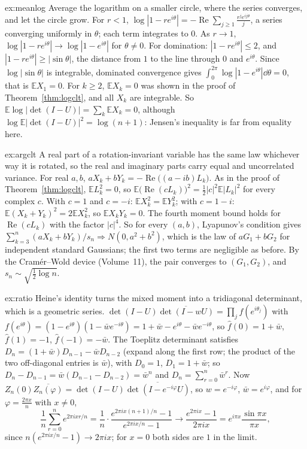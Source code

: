 \begin{solution}{ex:meanlog}
\idea Average the logarithm on a smaller circle, where the series converges, and let the circle grow.
\writeup For $r<1$, $\log|1-re^{i\theta}|=-\operatorname{Re}\sum_{j\ge1}\frac{r^je^{ij\theta}}j$, a series converging uniformly in $\theta$; each term integrates to $0$. As $r\to1$, $\log|1-re^{i\theta}|\to\log|1-e^{i\theta}|$ for $\theta\ne0$. For domination: $|1-re^{i\theta}|\le2$, and $|1-re^{i\theta}|\ge|\sin\theta|$, the distance from $1$ to the line through $0$ and $e^{i\theta}$. Since $\log|\sin\theta|$ is
integrable, dominated convergence gives $\int_0^{2\pi}\log|1-e^{i\theta}|\dd\theta=0$, that is $\mathbb EX_1=0$. For $k\ge2$, $\mathbb EX_k=0$ was shown in the proof of Theorem~\ref{thm:logclt}, and all $X_k$ are integrable. So
$\mathbb E\log|\det(I-U)|=\sum_k\mathbb EX_k=0$, although $\log\mathbb E|\det(I-U)|^2=\log(n+1)$: Jensen's inequality is far from equality here.
\end{solution}

\begin{solution}{ex:argclt}
\idea A real part of a rotation-invariant variable has the same law whichever way it is rotated, so the real and imaginary parts carry equal and uncorrelated variance.
\writeup For real $a,b$, $aX_k+bY_k=-\operatorname{Re}\bigl((a-ib)L_k\bigr)$. As in the proof of Theorem~\ref{thm:logclt}, $\mathbb EL_k^2=0$, so $\mathbb E\bigl(\operatorname{Re}(cL_k)\bigr)^2=\frac12|c|^2\mathbb E|L_k|^2$ for every complex $c$. With $c=1$ and $c=-i$:
$\mathbb EX_k^2=\mathbb EY_k^2$; with $c=1-i$: $\mathbb E(X_k+Y_k)^2=2\mathbb EX_k^2$, so $\mathbb EX_kY_k=0$. The fourth moment bound holds for $\operatorname{Re}(cL_k)$ with the factor $|c|^4$. So for every $(a,b)$, Lyapunov's condition gives
$\sum_{k=3}^n(aX_k+bY_k)/s_n\Rightarrow N(0,a^2+b^2)$, which is the law of $aG_1+bG_2$ for independent standard Gaussians; the first two terms are negligible as before. By the Cram\'er--Wold device (Volume~11), the pair converges to $(G_1,G_2)$, and
$s_n\sim\sqrt{\frac12\log n}$.
\end{solution}

\begin{solution}{ex:ratio}
\idea Heine's identity turns the mixed moment into a tridiagonal determinant, which is a geometric series.
\writeup $\det(I-U)\overline{\det(I-wU)}=\prod_jf(e^{i\theta_j})$ with $f(e^{i\theta})=(1-e^{i\theta})(1-\bar we^{-i\theta})=1+\bar w-e^{i\theta}-\bar we^{-i\theta}$, so $\hat f(0)=1+\bar w$, $\hat f(1)=-1$, $\hat f(-1)=-\bar w$. The Toeplitz determinant satisfies
$D_n=(1+\bar w)D_{n-1}-\bar wD_{n-2}$ (expand along the first row; the product of the two off-diagonal entries is $\bar w$), with $D_0=1$, $D_1=1+\bar w$; so $D_n-D_{n-1}=\bar w(D_{n-1}-D_{n-2})=\bar w^n$ and $D_n=\sum_{r=0}^n\bar w^r$.
Now $Z_n(0)\overline{Z_n(\varphi)}=\det(I-U)\overline{\det(I-e^{-i\varphi}U)}$, so $w=e^{-i\varphi}$, $\bar w=e^{i\varphi}$, and for $\varphi=\frac{2\pi x}n$ with $x\ne0$,
\[
\frac1n\sum_{r=0}^ne^{2\pi ixr/n}=\frac1n\cdot\frac{e^{2\pi ix(n+1)/n}-1}{e^{2\pi ix/n}-1}\longrightarrow\frac{e^{2\pi ix}-1}{2\pi ix}=e^{i\pi x}\frac{\sin\pi x}{\pi x},
\]
since $n(e^{2\pi ix/n}-1)\to2\pi ix$; for $x=0$ both sides are $1$ in the limit.
\end{solution}

